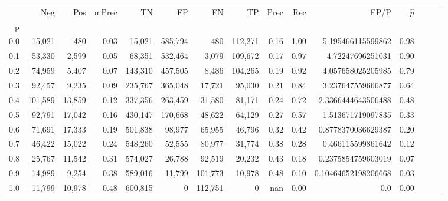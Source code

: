 \begin{tabular}{rrrrrrrrrrrrrrr}
\toprule
{} &      Neg &     Pos & mPrec &       TN &       FP &       FN &       TP &  Prec &   Rec &                 FP/P & $\hat{p}$ \\
p   &          &         &       &          &          &          &          &       &       &                      &           \\
\midrule
0.0 &   15,021 &     480 &  0.03 &   15,021 &  585,794 &      480 &  112,271 &  0.16 &  1.00 &    5.195466115599862 &      0.98 \\
0.1 &   53,330 &   2,599 &  0.05 &   68,351 &  532,464 &    3,079 &  109,672 &  0.17 &  0.97 &     4.72247696251031 &      0.90 \\
0.2 &   74,959 &   5,407 &  0.07 &  143,310 &  457,505 &    8,486 &  104,265 &  0.19 &  0.92 &    4.057658025205985 &      0.79 \\
0.3 &   92,457 &   9,235 &  0.09 &  235,767 &  365,048 &   17,721 &   95,030 &  0.21 &  0.84 &    3.237647559666877 &      0.64 \\
0.4 &  101,589 &  13,859 &  0.12 &  337,356 &  263,459 &   31,580 &   81,171 &  0.24 &  0.72 &   2.3366444643506488 &      0.48 \\
0.5 &   92,791 &  17,042 &  0.16 &  430,147 &  170,668 &   48,622 &   64,129 &  0.27 &  0.57 &    1.513671719097835 &      0.33 \\
0.6 &   71,691 &  17,333 &  0.19 &  501,838 &   98,977 &   65,955 &   46,796 &  0.32 &  0.42 &   0.8778370036629387 &      0.20 \\
0.7 &   46,422 &  15,022 &  0.24 &  548,260 &   52,555 &   80,977 &   31,774 &  0.38 &  0.28 &    0.466115599861642 &      0.12 \\
0.8 &   25,767 &  11,542 &  0.31 &  574,027 &   26,788 &   92,519 &   20,232 &  0.43 &  0.18 &   0.2375854759603019 &      0.07 \\
0.9 &   14,989 &   9,254 &  0.38 &  589,016 &   11,799 &  101,773 &   10,978 &  0.48 &  0.10 &  0.10464652198206668 &      0.03 \\
1.0 &   11,799 &  10,978 &  0.48 &  600,815 &        0 &  112,751 &        0 &   nan &  0.00 &                  0.0 &      0.00 \\
\bottomrule
\end{tabular}
